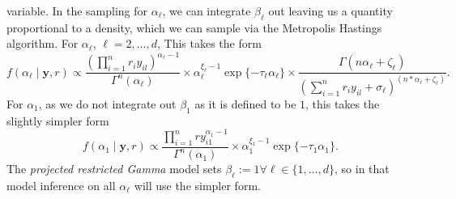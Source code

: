   variable.  In the sampling for $\alpha_{\ell}$, we can integrate $\beta_{\ell}$ out leaving us a
  quantity proportional to a density, which we can sample via the Metropolis Hastings
  algorithm\citep{hastings1970}.  For $\alpha_{\ell}$, $\ell = 2,\ldots, d$, This takes the form
  \begin{equation}
    \label{eqn:alphafc}
    f(\alpha_{\ell} \mid \bm{ y}, r) \propto
    \frac{\left({\textstyle \prod}_{i = 1}^nr_iy_{il}\right)^{\alpha_{\ell} - 1}}{\Gamma^n(\alpha_{\ell})} \times
    \alpha_{\ell}^{\xi_{\ell} - 1}\exp\{-\tau_{\ell}\alpha_{\ell}\} \times
    \frac{\Gamma(n\alpha_{\ell} + \zeta_{\ell})}{
        \left({\textstyle\sum}_{i = 1}^n r_iy_{il} + \sigma_{\ell}\right)^{(n * \alpha_{\ell} + \zeta_{\ell})}}.
  \end{equation}
  For $\alpha_1$, as we do not integrate out $\beta_1$ as it is defined to be $1$, this takes the
  slightly simpler form
  \begin{equation}
    \label{eqn:alphafc1}
    f(\alpha_1 \mid \bm{ y}, r) \propto
      \frac{{\textstyle\prod}_{i = 1}^n ry_{i1}^{\alpha_1 - 1}}{\Gamma^n(\alpha_1)} \times
      \alpha_1^{\xi_1 - 1}\exp\{-\tau_1\alpha_1\}.
  \end{equation}
  The \emph{projected restricted Gamma} model sets $\beta_{\ell} := 1 \forall \ell \in \lbrace 1,\ldots,d\rbrace$,
  so in that model inference on all $\alpha_{\ell}$ will use the simpler form.

